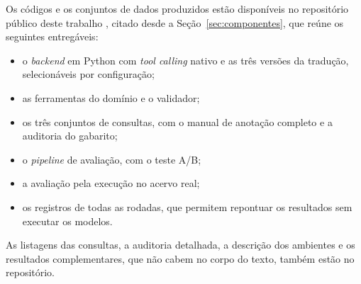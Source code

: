 Os códigos e os conjuntos de dados produzidos estão disponíveis no repositório público deste trabalho \cite{correa2026pfcbusca}, citado desde a Seção~\ref{sec:componentes}, que reúne os seguintes entregáveis:
\begin{itemize}
  \item o \textit{backend} em Python com \textit{tool calling} nativo e as três versões da tradução, selecionáveis por configuração;
  \item as ferramentas do domínio e o validador;
  \item os três conjuntos de consultas, com o manual de anotação completo e a auditoria do gabarito;
  \item o \textit{pipeline} de avaliação, com o teste A/B;
  \item a avaliação pela execução no acervo real;
  \item os registros de todas as rodadas, que permitem repontuar os resultados sem executar os modelos.
\end{itemize}

As listagens das consultas, a auditoria detalhada, a descrição dos ambientes e os resultados complementares, que não cabem no corpo do texto, também estão no repositório.

